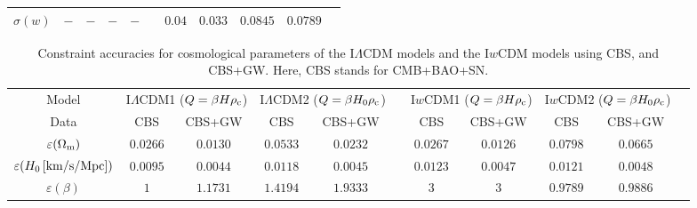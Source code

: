 \documentclass[aps,prd,nofootinbib,amsmath,amssymb,superscriptaddress,twocolumn,10pt]{revtex4}%
\begin{document}
\begin{table}
\begin{tabular}{ccccccccccc}
$\sigma(w)$                                      &$-$
                                         &$-$
                                         &$-$
                                         &$-$
                                         &&$0.04$
                                         &$0.033$
                                         &$0.0845$
                                         &$0.0789$\\


\hline
\end{tabular}

\end{table}
\begin{table}\small
\setlength\tabcolsep{2pt}
\renewcommand{\arraystretch}{1.5}
\centering
\caption{\label{tab4}Constraint accuracies for cosmological parameters of the I$\Lambda$CDM models and the I$w$CDM models using CBS, and CBS+GW. Here, CBS stands for CMB+BAO+SN.}
\begin{tabular}{ccccccccccc}


\hline Model &\multicolumn{2}{c}{I$\Lambda$CDM1 ($Q=\beta H\rho_{\rm c}$)}&\multicolumn{2}{c}{I$\Lambda$CDM2 ($Q=\beta H_{0}\rho_{\rm c}$)}&&\multicolumn{2}{c}{I$w$CDM1 ($Q=\beta H\rho_{\rm c}$)}&\multicolumn{2}{c}{I$w$CDM2 ($Q=\beta H_{0}\rho_{\rm c}$)}\\
           \cline{2-5}\cline{7-10}
       Data  & CBS&CBS+GW &CBS&CBS+GW &&CBS&CBS+GW&CBS&CBS+GW\\

\hline
$\varepsilon(\Omega_{\rm m})$                         &$0.0266$
                                         &$0.0130$
                                         &$0.0533$
                                         &$0.0232$
                                         &&$0.0267$
                                         &$0.0126$
                                         &$0.0798$
                                         &$0.0665$\\

$\varepsilon(H_0\,[{\rm km}/{\rm s}/{\rm Mpc}])$      &$0.0095$
                                         &$0.0044$
                                         &$0.0118$
                                         &$0.0045$
                                         &&$0.0123$
                                         &$0.0047$
                                         &$0.0121$
                                         &$0.0048$\\

$\varepsilon(\beta)$                                  &$1$
                                         &$1.1731$
                                         &$1.4194$
                                         &$1.9333$
                                         &&$3$
                                         &$3$
                                         &$0.9789$
                                         &$0.9886$\\


\end{tabular}
\end{table}
\end{document}
